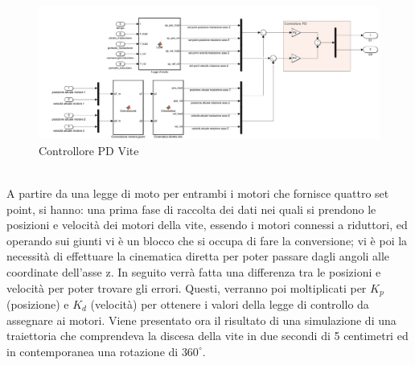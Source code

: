 \begin{figure}[ht]
	\begin{center}
		\includegraphics[scale=0.35]{Immagini/Controllori/Vite}
		\caption{Controllore PD Vite}
		\label{fig:PDVite}
	\end{center}
\end{figure}
\\A partire da una legge di moto per entrambi i motori che fornisce quattro set point, si hanno: una prima fase di raccolta dei dati nei quali si prendono le posizioni e velocità dei motori della vite, essendo i motori connessi a riduttori, ed operando sui giunti vi è un blocco che si occupa di fare la conversione;  vi è poi la necessità di effettuare la cinematica diretta per poter passare dagli angoli alle coordinate dell'asse z. In seguito verrà fatta una differenza tra le posizioni e velocità per poter trovare gli errori. Questi, verranno poi moltiplicati per $K_p$ (posizione) e $K_d$ (velocità) per ottenere i valori della legge di controllo da assegnare ai motori.
Viene presentato ora il risultato di una simulazione di una traiettoria che comprendeva la discesa della vite in due secondi di 5 centimetri ed in contemporanea una rotazione di $360^\circ$.
